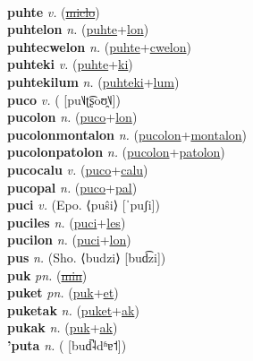 \label{'puhkinafasowon} \\
\textbf{puhte} \textit{v.} (\hyperref[miclo]{\sout{miclo}})
 \label{puhte} \\
\textbf{puhtelon} \textit{n.} (\hyperref[puhte]{puhte}+\hyperref[lon]{lon})
 \label{puhtelon} \\
\textbf{puhtecwelon} \textit{n.} (\hyperref[puhte]{puhte}+\hyperref[cwelon]{cwelon})
 \label{puhtecwelon} \\
\textbf{puhteki} \textit{v.} (\hyperref[puhte]{puhte}+\hyperref[ki]{ki})
 \label{puhteki} \\
\textbf{puhtekilum} \textit{n.} (\hyperref[puhteki]{puhteki}+\hyperref[lum]{lum})
 \label{puhtekilum} \\
\textbf{puco} \textit{v.} ( [pu˥˩ʈ͡ʂoʊ̯˥˩])
 \label{puco} \\
\textbf{pucolon} \textit{n.} (\hyperref[puco]{puco}+\hyperref[lon]{lon})
 \label{pucolon} \\
\textbf{pucolonmontalon} \textit{n.} (\hyperref[pucolon]{pucolon}+\hyperref[montalon]{montalon})
 \label{pucolonmontalon} \\
\textbf{pucolonpatolon} \textit{n.} (\hyperref[pucolon]{pucolon}+\hyperref[patolon]{patolon})
 \label{pucolonpatolon} \\
\textbf{pucocalu} \textit{v.} (\hyperref[puco]{puco}+\hyperref[calu]{calu})
 \label{pucocalu} \\
\textbf{pucopal} \textit{n.} (\hyperref[puco]{puco}+\hyperref[pal]{pal})
 \label{pucopal} \\
\textbf{puci} \textit{v.} (Epo. ⟨puŝi⟩ [ˈpuʃi])
 \label{puci} \\
\textbf{puciles} \textit{n.} (\hyperref[puci]{puci}+\hyperref[les]{les})
 \label{puciles} \\
\textbf{pucilon} \textit{n.} (\hyperref[puci]{puci}+\hyperref[lon]{lon})
 \label{pucilon} \\
\textbf{pus} \textit{n.} (Sho. ⟨budzi⟩ [bud͡zi])
 \label{pus} \\
\textbf{puk} \textit{pn.} (\hyperref[min]{\sout{min}})
 \label{puk} \\
\textbf{puket} \textit{pn.} (\hyperref[puk]{puk}+\hyperref[et]{et})
 \label{puket} \\
\textbf{puketak} \textit{n.} (\hyperref[puket]{puket}+\hyperref[ak]{ak})
 \label{puketak} \\
\textbf{pukak} \textit{n.} (\hyperref[puk]{puk}+\hyperref[ak]{ak})
 \label{pukak} \\
\textbf{'puta} \textit{n.} ( [bud̚˨dʱɐ˦])
